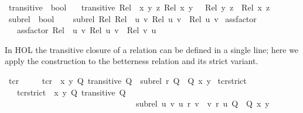 \begin{isabellebody}
\begin{isamarkuptext}
\end{isamarkuptext}\isamarkuptrue%
\isamarkupfalse%
\ transitive\ {\isacharcolon}{\kern0pt}{\isacharcolon}{\kern0pt}\ {\isachardoublequoteopen}{\isasymalpha}{\isasymRightarrow}bool{\isachardoublequoteclose}\isanewline
\ \ \ {\isachardoublequoteopen}transitive\ Rel\ {\isasymequiv}\ {\isasymforall}x\ y\ z{\isachardot}{\kern0pt}\ Rel\ x\ y\ {\isasymand}\ \ Rel\ y\ z\ {\isasymlongrightarrow}\ Rel\ x\ z{\isachardoublequoteclose}\isanewline
{}\isamarkupfalse%
\ sub{\isacharunderscore}{\kern0pt}rel\ {\isacharcolon}{\kern0pt}{\isacharcolon}{\kern0pt}\ {\isachardoublequoteopen}{\isasymalpha}{\isasymRightarrow}{\isasymalpha}{\isasymRightarrow}bool{\isachardoublequoteclose}\ \isanewline
\ \ \ {\isachardoublequoteopen}sub{\isacharunderscore}{\kern0pt}rel\ Rel{}\ Rel{}\ {\isasymequiv}\ {\isasymforall}u\ v{\isachardot}{\kern0pt}\ Rel{}\ u\ v\ {\isasymlongrightarrow}\ Rel{}\ u\ v{\isachardoublequoteclose}\isanewline
{}\isamarkupfalse%
\ assfactor{\isacharcolon}{\kern0pt}{\isacharcolon}{\kern0pt}{\isachardoublequoteopen}{\isasymalpha}{\isasymRightarrow}{\isasymalpha}{\isachardoublequoteclose}\ \isanewline
\ \ \ {\isachardoublequoteopen}assfactor\ Rel\ {\isasymequiv}\ {\isasymlambda}u\ v{\isachardot}{\kern0pt}\ Rel\ u\ v\ {\isasymand}\ {\isasymnot}Rel\ v\ u\ {\isachardoublequoteclose}%
\begin{isamarkuptext}%
In HOL the transitive closure of a relation can be defined in a single line; 
here we apply the construction to the betterness relation and its strict variant.%
\end{isamarkuptext}\isamarkuptrue%
\isamarkupfalse%
\ tcr\ \ \isanewline
\ \ \ {\isachardoublequoteopen}tcr\ {\isasymequiv}\ {\isasymlambda}x\ y{\isachardot}{\kern0pt}\ {\isasymforall}Q{\isachardot}{\kern0pt}\ transitive\ Q\ {\isasymlongrightarrow}\ {\isacharparenleft}{\kern0pt}sub{\isacharunderscore}{\kern0pt}rel\ r\ Q\ {\isasymlongrightarrow}\ Q\ x\ y{\isacharparenright}{\kern0pt}{\isachardoublequoteclose}\isanewline
\isanewline
{}\isamarkupfalse%
\ tcr{\isacharunderscore}{\kern0pt}strict\isanewline
\ \ \ {\isachardoublequoteopen}tcr{\isacharunderscore}{\kern0pt}strict\ {\isasymequiv}\ {\isasymlambda}x\ y{\isachardot}{\kern0pt}\ {\isasymforall}Q{\isachardot}{\kern0pt}\ transitive\ Q\ \isanewline
\ \ \ \ \ \ \ \ \ \ \ \ \ \ \ \ \ \ \ \ \ \ \ \ \ \ \ \ \ \ \ {\isasymlongrightarrow}\ {\isacharparenleft}{\kern0pt}sub{\isacharunderscore}{\kern0pt}rel\ {\isacharparenleft}{\kern0pt}{\isasymlambda}u\ v{\isachardot}{\kern0pt}\ u\ \isactrlbold r\ v\ {\isasymand}\ {\isasymnot}v\ \isactrlbold r\ u{\isacharparenright}{\kern0pt}\ Q\ {\isasymlongrightarrow}\ Q\ x\ y{\isacharparenright}{\kern0pt}{\isachardoublequoteclose}%

\end{isabellebody}
